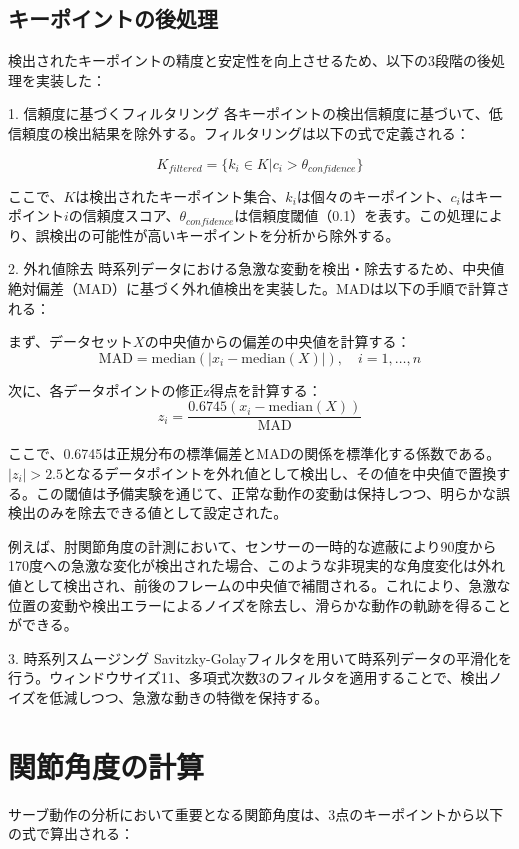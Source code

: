 \documentclass[oneside]{suribt}[11pt]
\begin{document}
\subsection{キーポイントの後処理}
検出されたキーポイントの精度と安定性を向上させるため、以下の3段階の後処理を実装した：

1. 信頼度に基づくフィルタリング
各キーポイントの検出信頼度に基づいて、低信頼度の検出結果を除外する。フィルタリングは以下の式で定義される：

\begin{equation}
K_{filtered} = \{k_i \in K | c_i > \theta_{confidence}\}
\end{equation}

ここで、$K$は検出されたキーポイント集合、$k_i$は個々のキーポイント、$c_i$はキーポイント$i$の信頼度スコア、$\theta_{confidence}$は信頼度閾値（0.1）を表す。この処理により、誤検出の可能性が高いキーポイントを分析から除外する。

2. 外れ値除去
時系列データにおける急激な変動を検出・除去するため、中央値絶対偏差（MAD）に基づく外れ値検出を実装した。MADは以下の手順で計算される：

まず、データセット$X$の中央値からの偏差の中央値を計算する：
\begin{equation}
\text{MAD} = \text{median}(|x_i - \text{median}(X)|), \quad i = 1,\ldots,n
\end{equation}

次に、各データポイントの修正z得点を計算する：
\begin{equation}
z_i = \frac{0.6745(x_i - \text{median}(X))}{\text{MAD}}
\end{equation}

ここで、0.6745は正規分布の標準偏差とMADの関係を標準化する係数である。$|z_i| > 2.5$となるデータポイントを外れ値として検出し、その値を中央値で置換する。この閾値は予備実験を通じて、正常な動作の変動は保持しつつ、明らかな誤検出のみを除去できる値として設定された。

例えば、肘関節角度の計測において、センサーの一時的な遮蔽により90度から170度への急激な変化が検出された場合、このような非現実的な角度変化は外れ値として検出され、前後のフレームの中央値で補間される。これにより、急激な位置の変動や検出エラーによるノイズを除去し、滑らかな動作の軌跡を得ることができる。

3. 時系列スムージング
Savitzky-Golayフィルタを用いて時系列データの平滑化を行う\cite{elliott2003}。ウィンドウサイズ11、多項式次数3のフィルタを適用することで、検出ノイズを低減しつつ、急激な動きの特徴を保持する。

\section{関節角度の計算}
サーブ動作の分析において重要となる関節角度は、3点のキーポイントから以下の式で算出される\cite{kovacs2011}：
\end{document}
